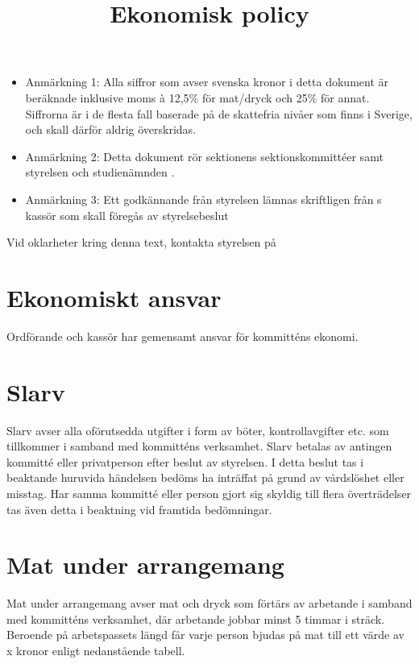 \documentclass[11pt, includeaddress]{../../classes/cthit}
\begin{document}
\title{Ekonomisk policy}
\maketitle

\thispagestyle{empty}

\newpage

\makeheadfoot%

\setcounter{tocdepth}{2}
\setcounter{page}{1}
\tableofcontents

\newpage

\begin{itemize}
	\item Anmärkning 1: Alla siffror som avser svenska kronor i detta dokument är beräknade inklusive moms à 12,5\% för mat/dryck och 25\% för annat. Siffrorna är i de flesta fall baserade på de skattefria nivåer som finns i Sverige, och skall därför aldrig överskridas.
	\item Anmärkning 2: Detta dokument rör sektionens sektionskommittéer samt styrelsen \STYRIT och studienämnden \SNIT. 
	\item Anmärkning 3: Ett godkännande från styrelsen lämnas skriftligen från \STYRIT{}s kassör som skall föregås av styrelsebeslut
\end{itemize}

Vid oklarheter kring denna text, kontakta styrelsen på 


\section{Ekonomiskt ansvar}
Ordförande och kassör har gemensamt ansvar för kommitténs ekonomi.


\section{Slarv}
Slarv avser alla oförutsedda utgifter i form av böter, kontrollavgifter etc. som tillkommer i samband med kommitténs verksamhet. Slarv betalas av antingen kommitté eller privatperson efter beslut av styrelsen. I detta beslut tas i beaktande huruvida händelsen bedöms ha inträffat på grund av vårdslöshet eller misstag. Har samma kommitté eller person gjort sig skyldig till flera överträdelser tas även detta i beaktning vid framtida bedömningar.


\section{Mat under arrangemang}
Mat under arrangemang avser mat och dryck som förtärs av arbetande i samband med kommitténs verksamhet, där arbetande jobbar minst 5 timmar i sträck. Beroende på arbetspassets längd får varje person bjudas på mat till ett värde av x kronor enligt nedanstående tabell.
\end{document}

